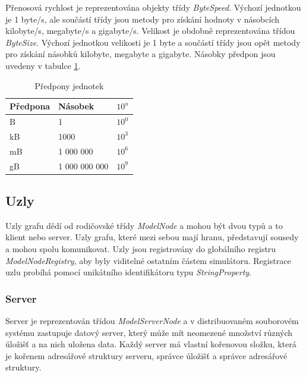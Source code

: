 \documentclass[czech,DP]{thesiskiv}
\begin{document}
Přenosová rychlost je reprezentována objekty třídy \textit{ByteSpeed}. Výchozí jednotkou je 1 byte/s, ale součástí třídy jsou metody pro získání hodnoty v násobcích kilobyte/s, megabyte/s a gigabyte/s. Velikost je obdobně reprezentována třídou \textit{ByteSize}. Výchozí jednotkou velikosti je 1 byte a součástí třídy jsou opět metody pro získání násobků kilobyte, megabyte a gigabyte. Násobky předpon jsou uvedeny v tabulce \ref{predpony_jednotky}.

\begin{table}[H]
\centering
\caption{Předpony jednotek}
\label{predpony_jednotky}
\begin{tabular}{|l|l|l|}
\hline
\textbf{Předpona} & \textbf{Násobek} & \textbf{$10^n$} \\ \hline
B                 & 1                & $10^0$       \\ \hline
kB                & 1000             & $10^3$          \\ \hline
mB                & 1 000 000        & $10^6$          \\ \hline
gB                & 1 000 000 000    & $10^9$          \\ \hline
\end{tabular}
\end{table}

\subsection{Uzly}

Uzly grafu dědí od rodičovské třídy \textit{ModelNode} a mohou být dvou typů a to klient nebo server. Uzly grafu, které mezi sebou mají hranu, představují sousedy a mohou spolu komunikovat. Uzly jsou registrovány do globálního registru \textit{ModelNodeRegistry}, aby byly viditelné ostatním částem simulátoru. Registrace uzlu probíhá pomocí unikátního identifikátoru typu \textit{StringProperty}.

\subsubsection*{Server}

Server je reprezentován třídou \textit{ModelServerNode} a v distribuovaném souborovém systému zastupuje datový server, který může mít neomezené množství různých úložišť a na nich uložena data. Každý server má vlastní kořenovou složku, která je kořenem adresářové struktury serveru, správce úložišť a správce adresářové struktury.
\end{document}

